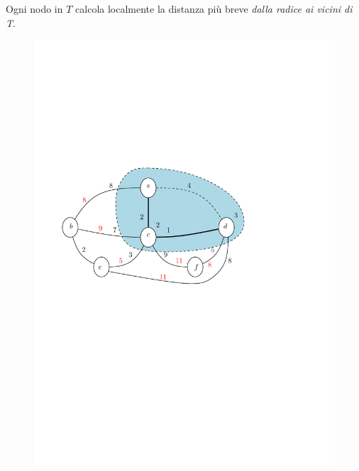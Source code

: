 \documentclass[10pt,xcolor=dvipsnames]{beamer}
\begin{document}
\begin{frame}
	Ogni nodo in $T$ calcola localmente la distanza più breve 
		\textit{dalla radice ai vicini di T}.
	\begin{figure}[h]
	\centering
		\includegraphics[scale=0.6]{PT2.pdf}
	\end{figure}
\end{frame}
\end{document}
